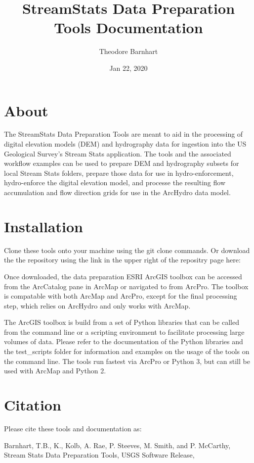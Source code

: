 \documentclass[letterpaper,10pt,english]{sphinxmanual}
\title{StreamStats Data Preparation Tools Documentation}
\date{Jan 22, 2020}
\author{Theodore Barnhart}
\begin{document}
\pagestyle{empty}
\sphinxmaketitle
\pagestyle{plain}
\sphinxtableofcontents
\pagestyle{normal}
\label{\detokenize{index::doc}}



\chapter{About}
\label{\detokenize{index:about}}
The StreamStats Data Preparation Tools are meant to aid in the processing of digital elevation models (DEM) and hydrography data for ingestion into the US Geological Survey’s Stream Stats application. The tools and the associated workflow examples can be used to prepare DEM and hydrography subsets for local Stream Stats folders, prepare those data for use in hydro-enforcement, hydro-enforce the digital elevation model, and processe the resulting flow accumulation and flow direction grids for use in the ArcHydro data model.


\chapter{Installation}
\label{\detokenize{index:installation}}
Clone these tools onto your machine using the git clone commands. Or download the the repository using the link in the upper right of the repositry page here: 

Once downloaded, the data preparation ESRI ArcGIS toolbox can be accessed from the ArcCatalog pane in ArcMap or navigated to from ArcPro. The toolbox is compatable with both ArcMap and ArcPro, except for the final processing step, which relies on ArcHydro and only works with ArcMap.

The ArcGIS toolbox is build from a set of Python libraries that can be called from the command line or a scripting environment to facilitate processing large volumes of data. Please refer to the documentation of the Python libraries and the test\_scripts folder for information and examples on the usage of the tools on the command line. The tools run fastest via ArcPro or Python 3, but can still be used with ArcMap and Python 2.


\chapter{Citation}
\label{\detokenize{index:citation}}
Please cite these tools and documentation as:

Barnhart, T.B., K., Kolb, A. Rae, P. Steeves, M. Smith, and P. McCarthy, Stream Stats Data Preparation Tools, USGS Software Release, 
\end{document}
